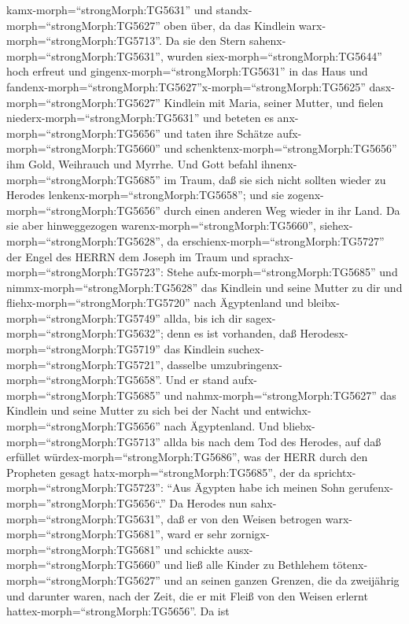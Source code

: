 kamx-morph=``strongMorph:TG5631'' und
standx-morph=``strongMorph:TG5627'' oben über, da das Kindlein
warx-morph=``strongMorph:TG5713''.  Da sie den Stern
sahenx-morph=``strongMorph:TG5631'', wurden
siex-morph=``strongMorph:TG5644'' hoch erfreut  und
gingenx-morph=``strongMorph:TG5631'' in das Haus und
fandenx-morph=``strongMorph:TG5627''\textbar x-morph=``strongMorph:TG5625''
dasx-morph=``strongMorph:TG5627'' Kindlein mit Maria, seiner Mutter, und
fielen niederx-morph=``strongMorph:TG5631'' und beteten es
anx-morph=``strongMorph:TG5656'' und taten ihre Schätze
aufx-morph=``strongMorph:TG5660'' und
schenktenx-morph=``strongMorph:TG5656'' ihm Gold, Weihrauch und Myrrhe.
 Und Gott befahl ihnenx-morph=``strongMorph:TG5685'' im
Traum, daß sie sich nicht sollten wieder zu Herodes
lenkenx-morph=``strongMorph:TG5658''; und sie
zogenx-morph=``strongMorph:TG5656'' durch einen anderen Weg wieder in
ihr Land.  Da sie aber hinweggezogen
warenx-morph=``strongMorph:TG5660'',
siehex-morph=``strongMorph:TG5628'', da
erschienx-morph=``strongMorph:TG5727'' der Engel des HERRN dem Joseph im
Traum und sprachx-morph=``strongMorph:TG5723'': Stehe
aufx-morph=``strongMorph:TG5685'' und nimmx-morph=``strongMorph:TG5628''
das Kindlein und seine Mutter zu dir und
fliehx-morph=``strongMorph:TG5720'' nach Ägyptenland und
bleibx-morph=``strongMorph:TG5749'' allda, bis ich dir
sagex-morph=``strongMorph:TG5632''; denn es ist vorhanden, daß
Herodesx-morph=``strongMorph:TG5719'' das Kindlein
suchex-morph=``strongMorph:TG5721'', dasselbe
umzubringenx-morph=``strongMorph:TG5658''.  Und er stand
aufx-morph=``strongMorph:TG5685'' und nahmx-morph=``strongMorph:TG5627''
das Kindlein und seine Mutter zu sich bei der Nacht und
entwichx-morph=``strongMorph:TG5656'' nach Ägyptenland. 
Und bliebx-morph=``strongMorph:TG5713'' allda bis nach dem Tod des
Herodes, auf daß erfüllet würdex-morph=``strongMorph:TG5686'', was der
HERR durch den Propheten gesagt hatx-morph=``strongMorph:TG5685'', der
da sprichtx-morph=``strongMorph:TG5723'': ``Aus Ägypten habe ich meinen
Sohn gerufenx-morph=''strongMorph:TG5656``.''  Da Herodes
nun sahx-morph=``strongMorph:TG5631'', daß er von den Weisen betrogen
warx-morph=``strongMorph:TG5681'', ward er sehr
zornigx-morph=``strongMorph:TG5681'' und schickte
ausx-morph=``strongMorph:TG5660'' und ließ alle Kinder zu Bethlehem
tötenx-morph=``strongMorph:TG5627'' und an seinen ganzen Grenzen, die da
zweijährig und darunter waren, nach der Zeit, die er mit Fleiß von den
Weisen erlernt hattex-morph=``strongMorph:TG5656''.  Da ist

